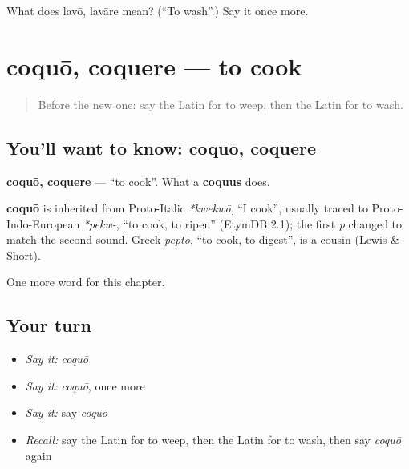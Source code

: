 \begin{tcolorbox}[breakable,colback=teal!4,colframe=teal!35!black,title={Before you move on}]
What does lavō, lavāre mean? (\textquotedblleft{}To wash\textquotedblright{}.) Say it once more.
\end{tcolorbox}
\section[coquō, coquere]{coquō, coquere — to cook}

\label{lesson:LA-C76-coquo}



\begin{quote}
Before the new one: say the Latin for to weep, then the Latin for to wash.
\end{quote}

\subsection*{You'll want to know: coquō, coquere}
\textbf{coquō, coquere} — \textquotedblleft{}to cook\textquotedblright{}. What a \textbf{coquus} does.

\begin{cousinweb}
\textbf{coquō} is inherited from Proto-Italic \emph{*kwekwō}, \textquotedblleft{}I cook\textquotedblright{}, usually traced to Proto-Indo-European \emph{*pekw-}, \textquotedblleft{}to cook, to ripen\textquotedblright{} (EtymDB 2.1); the first \emph{p} changed to match the second sound. Greek \emph{peptō}, \textquotedblleft{}to cook, to digest\textquotedblright{}, is a cousin (Lewis \& Short).
\end{cousinweb}

\begin{grammarlens}[title={What you've built}]
One more word for this chapter.
\end{grammarlens}

\subsection*{Your turn}
\begin{itemize}
\raggedright
  \item \emph{Say it:} \emph{coquō}
  \item \emph{Say it:} \emph{coquō}, once more
  \item \emph{Say it:} say \emph{coquō}
  \item \emph{Recall:} say the Latin for to weep, then the Latin for to wash, then say \emph{coquō} again
\end{itemize}

